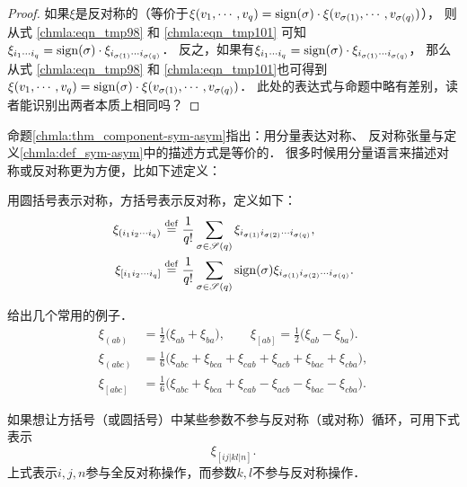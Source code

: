 \begin{proof}
    如果$\xi$是反对称的（等价于$\xi(v_1,\cdots,v_q)=
       {\rm sign}(\sigma) \cdot \xi( v_{\sigma(1)},\cdots, v_{\sigma(q)})$），
    则从式 \eqref{chmla:eqn_tmp98} 和 \eqref{chmla:eqn_tmp101}
    可知$\xi_{i_1 \cdots i_q}= {\rm sign}(\sigma) \cdot \xi_{i_{\sigma(1)} \cdots i_{\sigma(q)}}$．
    反之，如果有$\xi_{i_1 \cdots i_q}={\rm sign}(\sigma) \cdot \xi_{i_{\sigma(1)} \cdots i_{\sigma(q)}}$，
    那么从式 \eqref{chmla:eqn_tmp98} 和 \eqref{chmla:eqn_tmp101}也可得到
    $\xi(v_1,\cdots,v_q)={\rm sign}(\sigma) \cdot\xi( v_{\sigma(1)},\cdots, v_{\sigma(q)})$．
    此处的表达式与命题中略有差别，读者能识别出两者本质上相同吗？
\end{proof}

命题\ref{chmla:thm_component-sym-asym}指出：用分量表达对称、
反对称张量与定义\ref{chmla:def_sym-asym}中的描述方式是等价的．
很多时候用分量语言来描述对称或反对称更为方便，比如下述定义：

\begin{definition}\label{chmla:def_sym-antis}
    用圆括号表示对称，方括号表示反对称，定义如下：
    \begin{align}
        \xi_{(i_1 i_2 \cdots i_q)}& \overset{\mathrm {def}}{=} \frac{1}{q!}
        \sum_{\sigma\in \mathscr{S}(q)} \xi_{i_{\sigma(1)} i_{\sigma(2)} \cdots i_{\sigma(q)}}, \\
        \xi_{[i_1 i_2 \cdots i_q]}& \overset{\mathrm {def}}{=} \frac{1}{q!}
        \sum_{\sigma\in \mathscr{S}(q)}{\rm sign}(\sigma) \xi_{i_{\sigma(1)} i_{\sigma(2)} \cdots i_{\sigma(q)}}.
    \end{align}
\end{definition}
给出几个常用的例子．
\begin{align}
    \xi_{(ab)} & {=} \frac{1}{2} \bigl(\xi_{ab} + \xi_{ba} \bigr), \qquad
    \xi_{[ab]}   {=} \frac{1}{2} \bigl(\xi_{ab} - \xi_{ba} \bigr). \\
    \xi_{(abc)}& {=} \frac{1}{6} \bigl(\xi_{abc} + \xi_{bca} + \xi_{cab} + \xi_{acb} + \xi_{bac} + \xi_{cba} \bigr), \label{chmla:eqn_tmp590} \\
    \xi_{[abc]}& {=} \frac{1}{6} \bigl(\xi_{abc} + \xi_{bca} + \xi_{cab} - \xi_{acb} - \xi_{bac} - \xi_{cba} \bigr) .\label{chmla:eqn_tmp592}
\end{align}

如果想让方括号（或圆括号）中某些参数不参与反对称（或对称）循环，可用下式表示
\begin{equation}
    \xi_{[ij|kl|n]}.
\end{equation}
上式表示$i,j,n$参与全反对称操作，而参数$k,l$不参与反对称操作．

